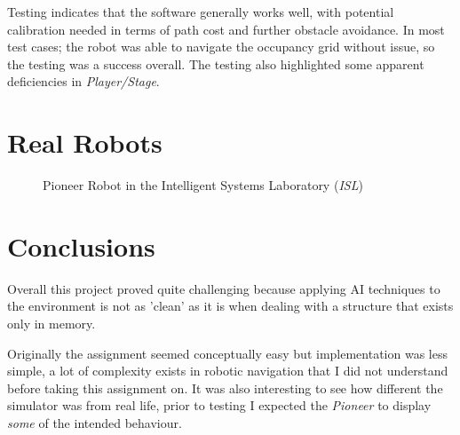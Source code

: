 \documentclass[a4paper,12pt]{article}
\begin{document}
Testing indicates that the software generally works well, with potential calibration needed in terms of path cost and further obstacle avoidance. In most test cases; the robot was able to navigate the occupancy grid without issue, so the testing was a success overall. The testing also highlighted some apparent deficiencies in \textit{Player/Stage}.

\section{Real Robots}
\begin{figure}[h!]
\begin{center}
    \caption{Pioneer Robot in the Intelligent Systems Laboratory (\textit{ISL})}
\end{center}
\end{figure}
\section{Conclusions}
Overall this project proved quite challenging because applying AI techniques to the environment is not as 'clean' as it is when dealing with a structure that exists only in memory. 

Originally the assignment seemed conceptually easy but implementation was less simple, a lot of complexity exists in robotic navigation that I did not understand before taking this assignment on. It was also interesting to see how different the simulator was from real life, prior to testing I expected the \textit{Pioneer} to display \textit{some} of the intended behaviour.
\end{document}
